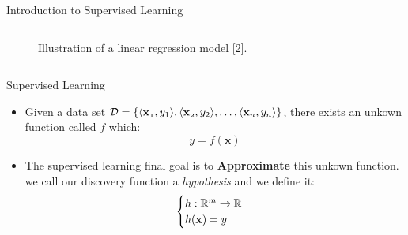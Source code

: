 \documentclass[compress,oilve]{beamer}
\begin{document}
\begin{frame}{Introduction to Supervised Learning}
\begin{columns}
\begin{column}{0.5\textwidth}
\begin{figure}
 \caption{Illustration of a linear regression model [2].}
\end{figure}
\end{column}
\end{columns}
\end{frame}

\begin{frame}{Supervised Learning}
\begin{itemize}
\item Given a data set $ \mathcal{D} = \{ \langle \mathbf{x_{\mathnormal 1}} , y_{1} \rangle, \langle \mathbf{x_{\mathnormal 2}} , y_{2} \rangle, \dots, \langle \mathbf{x_{\mathnormal n}} , y_{n} \rangle\} $, there exists an unkown function called $ f $ which:
$$ y = f(\mathbf{x})$$
\item The supervised learning final goal is to \textbf{Approximate} this unkown function. we call our discovery function a \textit{hypothesis} and we define it:
$$  \begin{cases}
       h: \mathbb{R^{\mathnormal m}} \rightarrow \mathbb{R} \\
       h(\mathbf{x}) = y  
  \end{cases} $$
\end{itemize}
\end{frame}
\end{document}
